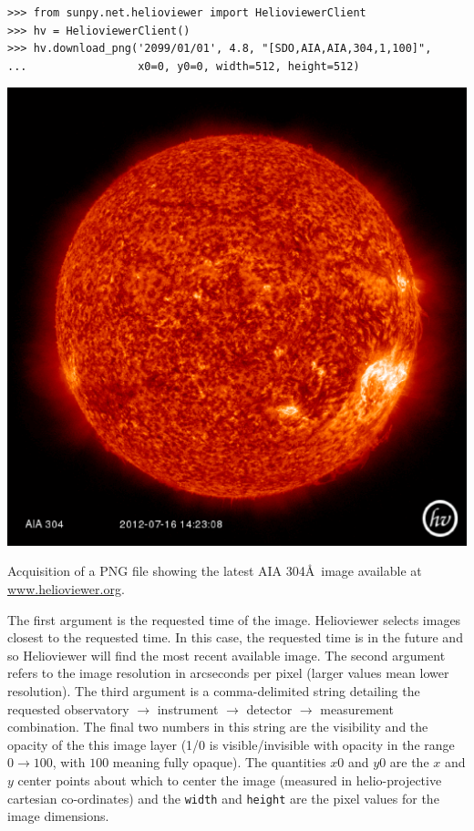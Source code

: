 \begin{listing}[H]
\begin{verbatim}
>>> from sunpy.net.helioviewer import HelioviewerClient
>>> hv = HelioviewerClient()
>>> hv.download_png('2099/01/01', 4.8, "[SDO,AIA,AIA,304,1,100]",
...                 x0=0, y0=0, width=512, height=512)
\end{verbatim}
\includegraphics[width=0.8\columnwidth]{helioviewer_latest_aia_304}
\caption{Acquisition of a PNG file showing the latest AIA 304\AA\ image 
available at \url{www.helioviewer.org}.}
\label{code:hv:downloadlatestpng}
\end{listing}

The first argument is the requested time of the image.  Helioviewer
selects images closest to the requested time.  In this case, the
requested time is in the future and so Helioviewer will find the most
recent available image.  The second argument refers to the image
resolution in arcseconds per pixel (larger values mean lower
resolution).  The third argument is a comma-delimited string detailing
the requested observatory $\rightarrow$ instrument $\rightarrow$
detector $\rightarrow$ measurement combination.  The final two numbers
in this string are the visibility and the opacity of the this image
layer (1/0 is visible/invisible with opacity in the range
$0\rightarrow100$, with $100$ meaning fully opaque).  The quantities
$x0$ and $y0$ are the $x$ and $y$ center points about which to center
the image (measured in helio-projective cartesian co-ordinates) and
the \texttt{width} and \texttt{height} are the pixel values for the
image dimensions.

